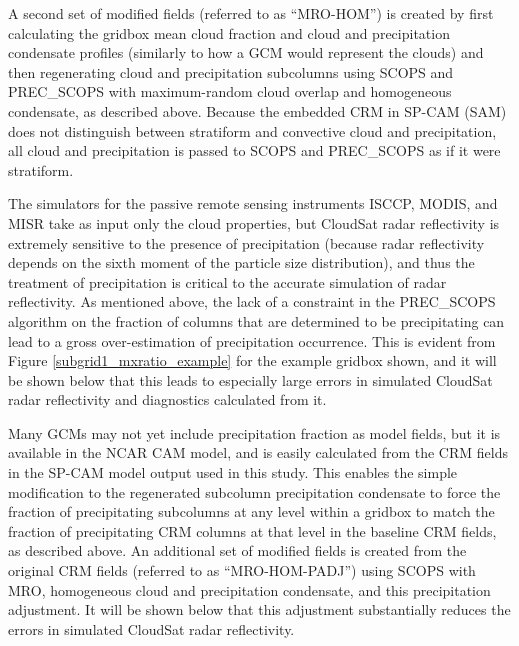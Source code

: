 A second set of modified fields (referred to as ``MRO-HOM'') is created by first calculating the gridbox mean cloud fraction and cloud and precipitation condensate profiles (similarly to how a GCM would represent the clouds) and then regenerating cloud and precipitation subcolumns using SCOPS and PREC\_SCOPS with maximum-random cloud overlap and homogeneous condensate, as described above. Because the embedded CRM in SP-CAM (SAM) does not distinguish between stratiform and convective cloud and precipitation, all cloud and precipitation is passed to SCOPS and PREC\_SCOPS as if it were stratiform.

The simulators for the passive remote sensing instruments ISCCP, MODIS, and MISR take as input only the cloud properties, but CloudSat radar reflectivity is extremely sensitive to the presence of precipitation (because radar reflectivity depends on the sixth moment of the particle size distribution), and thus the treatment of precipitation is critical to the accurate simulation of radar reflectivity. As mentioned above, the lack of a constraint in the PREC\_SCOPS algorithm on the fraction of columns that are determined to be precipitating can lead to a gross over-estimation of precipitation occurrence. This is evident from Figure \ref{subgrid1_mxratio_example} for the example gridbox shown, and it will be shown below that this leads to especially large errors in simulated CloudSat radar reflectivity and diagnostics calculated from it.

Many GCMs may not yet include precipitation fraction as model fields, but it is available in the NCAR CAM model, and is easily calculated from the CRM fields in the SP-CAM model output used in this study. This enables the simple modification to the regenerated subcolumn precipitation condensate to force the fraction of precipitating subcolumns at any level within a gridbox to match the fraction of precipitating CRM columns at that level in the baseline CRM fields, as described above. An additional set of modified fields is created from the original CRM fields (referred to as ``MRO-HOM-PADJ'') using SCOPS with MRO, homogeneous cloud and precipitation condensate, and this precipitation adjustment. It will be shown below that this adjustment substantially reduces the errors in simulated CloudSat radar reflectivity.

